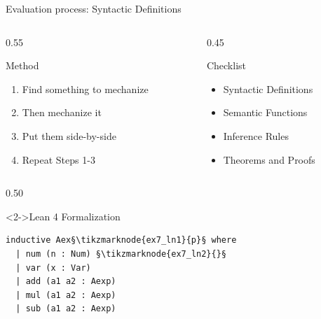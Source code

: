 \documentclass[xcolor={dvipsnames,table}]{beamer}
\begin{document}
\begin{frame}[fragile]{Evaluation process: \alert{Syntactic Definitions}}
    \begin{columns}[T]
        \begin{column}{0.55\textwidth}
            \begin{block}{Method}
\begin{enumerate}
    \item<1-> Find something to mechanize
    \item<2-> Then mechanize it
    \item<3-> Put them side-by-side
    \item<5-> Repeat Steps 1-3
\end{enumerate}
            \end{block}
        \end{column}
        \begin{column}{0.45\textwidth}
            \begin{block}{Checklist}
\begin{itemize}
    \item Syntactic Definitions \No
    \item Semantic Functions \No
    \item Inference Rules \No
    \item Theorems and Proofs \No
\end{itemize}
            \end{block}
        \end{column}
    \end{columns}

    
    \begin{columns}[T]
        
        \begin{column}{0.50\textwidth}
            \begin{block}<2->{Lean 4 Formalization}
                \begin{lstlisting}[style=lean4]
inductive Aex§\tikzmarknode{ex7_ln1}{p}§ where
  | num (n : Num) §\tikzmarknode{ex7_ln2}{}§
  | var (x : Var)
  | add (a1 a2 : Aexp)
  | mul (a1 a2 : Aexp)
  | sub (a1 a2 : Aexp)
                \end{lstlisting}
            \end{block}
        \end{column}


\end{columns}
\end{frame}
\end{document}
